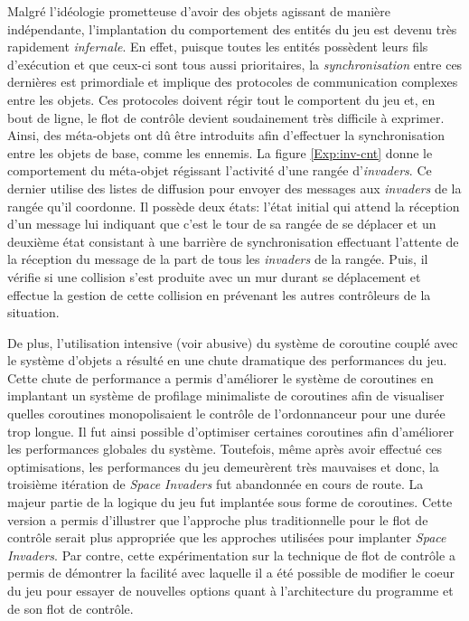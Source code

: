 \documentclass[12pt,twoside,letterpaper,francais]{book}
\newcommand{\scheme}[1]{\selectlanguage{english}{\tt #1}\selectlanguage{french}}
\begin{document}
Malgré l'idéologie prometteuse d'avoir des objets agissant de manière
indépendante, l'implantation du comportement des entités du jeu est
devenu très rapidement \emph{infernale}. En effet, puisque toutes les
entités possèdent leurs fils d'exécution et que ceux-ci sont tous
aussi prioritaires, la \emph{synchronisation} entre ces dernières est
primordiale et implique des protocoles de communication complexes
entre les objets. Ces protocoles doivent régir tout le comportent du
jeu et, en bout de ligne, le flot de contrôle devient soudainement
très difficile à exprimer. Ainsi, des méta-objets ont dû être
introduits afin d'effectuer la synchronisation entre les objets de
base, comme les ennemis. La figure \ref{Exp:inv-cnt} donne le
comportement du méta-objet régissant l'activité d'une rangée
d'\textit{invaders}. Ce dernier utilise des listes de diffusion pour
envoyer des messages aux \textit{invaders} de la rangée qu'il
coordonne. Il possède deux états: l'état initial qui attend la
réception d'un message lui indiquant que c'est le tour de sa rangée de
se déplacer et un deuxième état consistant à une barrière de
synchronisation effectuant l'attente de la réception du message
\scheme{moved} de la part de tous les \textit{invaders} de la
rangée. Puis, il vérifie si une collision s'est produite avec un mur
durant se déplacement et effectue la gestion de cette collision en
prévenant les autres contrôleurs de la situation.

De plus, l'utilisation intensive (voir abusive) du système de
coroutine couplé avec le système d'objets a résulté en une chute
dramatique des performances du jeu. Cette chute de performance a
permis d'améliorer le système de coroutines en implantant un système
de profilage minimaliste de coroutines afin de visualiser quelles
coroutines monopolisaient le contrôle de l'ordonnanceur pour une durée
trop longue. Il fut ainsi possible d'optimiser certaines coroutines
afin d'améliorer les performances globales du système. Toutefois, même
après avoir effectué ces optimisations, les performances du jeu
demeurèrent très mauvaises et donc, la troisième itération de \textit{Space Invaders} fut
abandonnée en cours de route. La majeur partie de la logique du jeu
fut implantée sous forme de coroutines. Cette version a permis
d'illustrer que l'approche plus traditionnelle pour le flot de
contrôle serait plus appropriée que les approches utilisées pour
implanter \textit{Space Invaders}. Par contre, cette expérimentation sur la technique de
flot de contrôle a permis de démontrer la facilité avec laquelle il a
été possible de modifier le coeur du jeu pour essayer de nouvelles
options quant à l'architecture du programme et de son flot de
contrôle.\\
\end{document}
